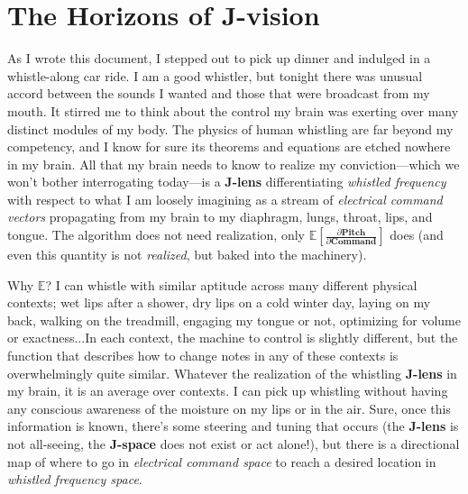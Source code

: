 \documentclass{article}
\begin{document}
\section{The Horizons of J-vision}

As I wrote this document, I stepped out to pick up dinner and indulged in a whistle-along car ride. I am a good whistler, but tonight there was unusual accord between the sounds I wanted and those that were broadcast from my mouth. It stirred me to think about the control my brain was exerting over many distinct modules of my body. The physics of human whistling are far beyond my competency, and I know for sure its theorems and equations are etched nowhere in my brain. All that my brain needs to know to realize my conviction---which we won't bother interrogating today---is a \textbf{J-lens} differentiating \textit{whistled frequency} with respect to what I am loosely imagining as a stream of \textit{electrical command vectors} propagating from my brain to my diaphragm, lungs, throat, lips, and tongue. The algorithm does not need realization, only \(\mathbb{E} [\frac {\partial \mathbf{Pitch}}  {\partial \mathbf{Command}}]\) does (and even this quantity is not \textit{realized}, but baked into the machinery).

Why \(\mathbb{E}\)? I can whistle with similar aptitude across many different physical contexts; wet lips after a shower, dry lips on a cold winter day, laying on my back, walking on the treadmill, engaging my tongue or not, optimizing for volume or exactness...In each context, the machine to control is slightly different, but the function that describes how to change notes in any of these contexts is overwhelmingly quite similar. Whatever the realization of the whistling \textbf{J-lens} in my brain, it is an average over contexts. I can pick up whistling without having any conscious awareness of the moisture on my lips or in the air. Sure, once this information is known, there's some steering and tuning that occurs (the \textbf{J-lens} is not all-seeing, the \textbf{J-space} does not exist or act alone!), but there is a directional map of where to go in \textit{electrical command space} to reach a desired location in \textit{whistled frequency space}. 
\end{document}

